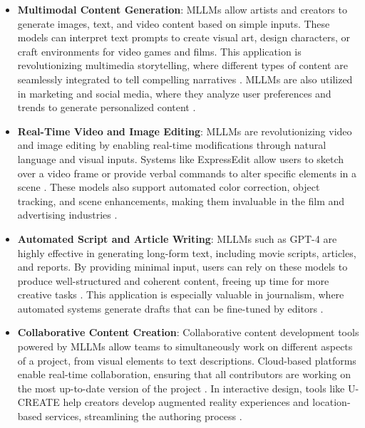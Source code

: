 \begin{itemize}

\item \textbf{Multimodal Content Generation}: MLLMs allow artists and creators to generate images, text, and video content based on simple inputs. These models can interpret text prompts to create visual art, design characters, or craft environments for video games and films. This application is revolutionizing multimedia storytelling, where different types of content are seamlessly integrated to tell compelling narratives \cite{vs2024chang,vs2024schmidt}. MLLMs are also utilized in marketing and social media, where they analyze user preferences and trends to generate personalized content \cite{vs2020parde}.

\item \textbf{Real-Time Video and Image Editing}: MLLMs are revolutionizing video and image editing by enabling real-time modifications through natural language and visual inputs. Systems like ExpressEdit allow users to sketch over a video frame or provide verbal commands to alter specific elements in a scene \cite{vs2024tilekbay}. These models also support automated color correction, object tracking, and scene enhancements, making them invaluable in the film and advertising industries \cite{vs2024kubicek}.

\item \textbf{Automated Script and Article Writing}: MLLMs such as GPT-4 are highly effective in generating long-form text, including movie scripts, articles, and reports. By providing minimal input, users can rely on these models to produce well-structured and coherent content, freeing up time for more creative tasks \cite{vs2024eleftheriadis}. This application is especially valuable in journalism, where automated systems generate drafts that can be fine-tuned by editors \cite{vs2024anderson}.

\item \textbf{Collaborative Content Creation}: Collaborative content development tools powered by MLLMs allow teams to simultaneously work on different aspects of a project, from visual elements to text descriptions. Cloud-based platforms enable real-time collaboration, ensuring that all contributors are working on the most up-to-date version of the project \cite{vs2024santos}. In interactive design, tools like U-CREATE help creators develop augmented reality experiences and location-based services, streamlining the authoring process \cite{vs2024sauer}.


\end{itemize}
